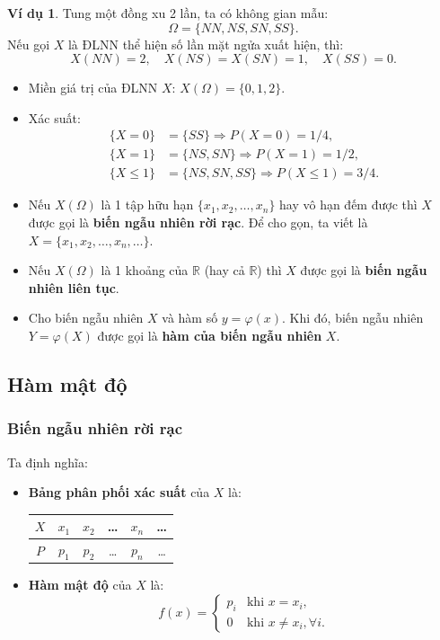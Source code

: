 \documentclass[12pt,a4paper]{article}
\theoremstyle{definition}
\newtheorem{vidu}{Ví dụ}[section]
\begin{document}
\begin{vidu}
Tung một đồng xu 2 lần, ta có không gian mẫu:
\[
\Omega = \{NN, NS, SN, SS\}.
\]
Nếu gọi $X$ là ĐLNN thể hiện số lần mặt ngửa xuất hiện, thì:
\[
X(NN) = 2, \quad X(NS) = X(SN) = 1, \quad X(SS) = 0.
\]
\begin{itemize}
    \item Miền giá trị của ĐLNN $X$: $X(\Omega) = \{0, 1, 2\}$.
    \item Xác suất:
    \begin{align*}
    \{X = 0\} &= \{SS\} \Rightarrow P(X = 0) = 1/4, \\
    \{X = 1\} &= \{NS, SN\} \Rightarrow P(X = 1) = 1/2, \\
    \{X \le 1\} &= \{NS, SN, SS\} \Rightarrow P(X \le 1) = 3/4.
    \end{align*}
\end{itemize}
\end{vidu}

\begin{itemize}
    \item Nếu $X(\Omega)$ là 1 tập hữu hạn $\{x_1, x_2, \dots, x_n\}$ hay vô hạn đếm được thì $X$ được gọi là \textbf{biến ngẫu nhiên rời rạc}. Để cho gọn, ta viết là $X = \{x_1, x_2, \dots, x_n, \dots\}$.
    \item Nếu $X(\Omega)$ là 1 khoảng của $\mathbb{R}$ (hay cả $\mathbb{R}$) thì $X$ được gọi là \textbf{biến ngẫu nhiên liên tục}.
    \item Cho biến ngẫu nhiên $X$ và hàm số $y = \varphi(x)$. Khi đó, biến ngẫu nhiên $Y = \varphi(X)$ được gọi là \textbf{hàm của biến ngẫu nhiên} $X$.
\end{itemize}

\subsection{Hàm mật độ}

\subsubsection{Biến ngẫu nhiên rời rạc}
Ta định nghĩa:
\begin{itemize}
    \item \textbf{Bảng phân phối xác suất} của $X$ là:
    \begin{center}
    \begin{tabular}{|c|c|c|c|c|c|}
    \hline
    $X$ & $x_1$ & $x_2$ & \dots & $x_n$ & \dots \\
    \hline
    $P$ & $p_1$ & $p_2$ & \dots & $p_n$ & \dots \\
    \hline
    \end{tabular}
    \end{center}

    \item \textbf{Hàm mật độ} của $X$ là:
    \[
    f(x) = \begin{cases}
    p_i & \text{khi } x = x_i, \\
    0 & \text{khi } x \ne x_i, \forall i.
    \end{cases}
    \]
\end{itemize}
\end{document}
